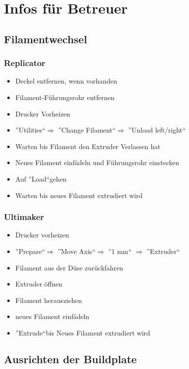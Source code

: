 \documentclass{\basedir/fablab-document}
\begin{document}
\section{Infos für Betreuer}

\subsection{Filamentwechsel}\label{filamentwechsel}

\subsubsection{Replicator}

\begin{itemize}
\item Deckel entfernen, wenn vorhanden
\item Filament-Führungsrohr entfernen
\item Drucker Vorheizen
\item ''Utilities``$\Rightarrow$ ''Change Filament``$\Rightarrow$ ''Unload left/right``
\item Warten bis Filament den Extruder Verlassen hat 
\item Neues Filament einfädeln und Führungsrohr einstecken
\item Auf ''Load``gehen
\item Warten bis neues Filament extrudiert wird
\end{itemize}

\subsubsection{Ultimaker}

\begin{itemize}
\item Drucker vorheizen
\item ''Prepare``$\Rightarrow$ ''Move Axis``$\Rightarrow$ ''1 mm`` $\Rightarrow$ ''Extruder``
\item Filament aus der Düse zurückfahren
\item Extruder öffnen
\item Filament herausziehen
\item neues Filament einfädeln
\item ''Extrude``bis Neues Filament extrudiert wird
\end{itemize}

\subsection{Ausrichten der Buildplate}
\end{document}
